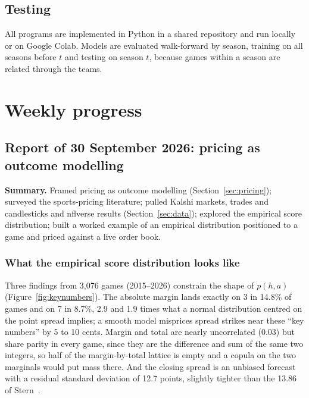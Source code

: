 \documentclass[11pt]{article}
\begin{document}
\subsection{Testing}

All programs are implemented in Python in a shared repository and run locally or on Google Colab. Models are evaluated walk-forward by season, training on all seasons before $t$ and testing on season $t$, because games within a season are related through the teams.

\section{Weekly progress}\label{sec:weekly}

\subsection{Report of 30 September 2026: pricing as outcome modelling}\label{sec:w0930}

\textbf{Summary.} Framed pricing as outcome modelling (Section~\ref{sec:pricing}); surveyed the sports-pricing literature; pulled Kalshi markets, trades and candlesticks and nflverse results (Section~\ref{sec:data}); explored the empirical score distribution; built a worked example of an empirical distribution positioned to a game and priced against a live order book.



\subsubsection{What the empirical score distribution looks like}

Three findings from 3,076 games (2015--2026) constrain the shape of $p(h,a)$ (Figure~\ref{fig:keynumbers}). The absolute margin lands exactly on 3 in 14.8\% of games and on 7 in 8.7\%, 2.9 and 1.9 times what a normal distribution centred on the point spread implies; a smooth model misprices spread strikes near these ``key numbers'' by 5 to 10 cents. Margin and total are nearly uncorrelated (0.03) but share parity in every game, since they are the difference and sum of the same two integers, so half of the margin-by-total lattice is empty and a copula on the two marginals would put mass there. And the closing spread is an unbiased forecast with a residual standard deviation of 12.7 points, slightly tighter than the 13.86 of Stern~\cite{stern1991}.
\end{document}
